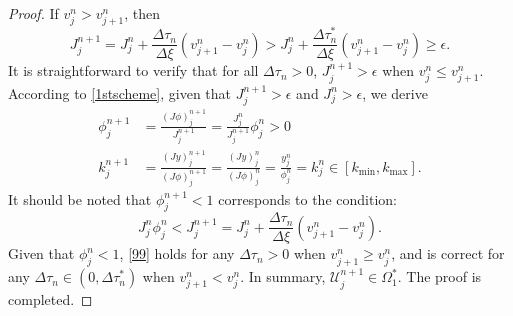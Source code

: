 \documentclass[times,final,11pt]{elsarticle}
\numberwithin{equation}{section}
\theoremstyle{definition}
\theoremstyle{remark}
\begin{document}
\begin{proof}
	If  $v_j^n > v_{j + 1}^n$, then 
	\begin{equation*}
	    J_j^{n + 1} = J_j^n + \frac{\Delta \tau_n}{\Delta \xi} \left( v_{j + 1}^n - v_j^n \right) > J_j^n + \frac{\Delta \tau_n^{*}}{\Delta \xi} \left( v_{j + 1}^n - v_j^n \right) \geq \epsilon.
	\end{equation*}
	It is straightforward to verify that for all $\Delta \tau_n > 0$, $J_j^{n + 1} > \epsilon$ when $v_j^n \leq v_{j + 1}^n$.
	According to \eqref{1stscheme}, given that $J_j^{n + 1} > \epsilon$ and $J_j^{n} > \epsilon$, we derive
	\begin{equation*}
	    \begin{aligned}
	        \phi_j^{n + 1} &= \frac{(J\phi)_j^{n + 1}}{J_j^{n + 1}} = \frac{J_j^{n}}{J_j^{n + 1}} \phi_j^{n} > 0 \\
	        k_j^{n + 1} &= \frac{(Jy)_j^{n + 1}}{(J\phi)_j^{n + 1}} = \frac{(Jy)_j^{n}}{(J\phi)_j^{n}} = \frac{y_j^n}{\phi_j^n} = k_j^n \in [k_{\min}, k_{\max}].
	    \end{aligned}
	\end{equation*}
	It should be noted that $\phi_j^{n + 1} < 1$ corresponds to the condition:  
	\begin{equation}
	\label{99}
		J_j^n \phi_j^n < J_j^{n + 1} = J_j^n + \frac{\Delta \tau_n}{\Delta \xi} \left( v_{j + 1}^n - v_j^n \right).
	\end{equation}
	Given that $\phi_j^{n} < 1$, \eqref{99} holds for any $\Delta \tau_n > 0$ when $v_{j + 1}^n \geq v_j^n$, and is correct for any $\Delta \tau_n \in (0, \Delta \tau_n^{*})$ when $v_{j + 1}^n < v_j^n$.
	In summary, $\boldsymbol{\mathcal{U}}_j^{n + 1} \in \Omega_1^*$. The proof is completed.
\end{proof}
\end{document}
